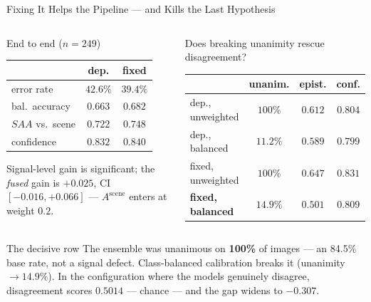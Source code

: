 \documentclass[aspectratio=169,11pt]{beamer}
\begin{document}
\begin{frame}{Fixing It Helps the Pipeline --- and Kills the Last Hypothesis}
\small
\begin{columns}[T]
\begin{exampleblock}{\small End to end ($n=249$)}
\scriptsize
\begin{tabular}{@{}l c c@{}}
\toprule
& \textbf{dep.} & \textbf{fixed} \\
\midrule
error rate & $42.6\%$ & $\mathbf{39.4\%}$ \\
bal.\ accuracy & $0.663$ & $\mathbf{0.682}$ \\
$SAA$ vs.\ scene & $0.722$ & $0.748$ \\
confidence & $0.832$ & $0.840$ \\
\bottomrule
\end{tabular}
\vspace{1mm}

{\tiny Signal-level gain is significant; the \emph{fused} gain is $+0.025$, CI $[-0.016,+0.066]$ --- $A^{\text{scene}}$ enters at weight $0.2$.}
\end{exampleblock}

\begin{center}
\scriptsize Does breaking unanimity rescue disagreement?
\vspace{1mm}

\begin{tabular}{@{}l c c c@{}}
\toprule
& \textbf{unanim.} & \textbf{epist.} & \textbf{conf.} \\
\midrule
dep., unweighted & $100\%$ & $0.612$ & $0.804$ \\
dep., balanced & $11.2\%$ & $0.589$ & $0.799$ \\
fixed, unweighted & $100\%$ & $0.647$ & $0.831$ \\
\textbf{fixed, balanced} & $\mathbf{14.9\%}$ & $\mathbf{0.501}$ & $0.809$ \\
\bottomrule
\end{tabular}
\end{center}
\end{columns}
\vspace{1mm}
\begin{alertblock}{\small The decisive row}
\footnotesize The ensemble was unanimous on \textbf{100\%} of images --- an 84.5\% base rate, not a signal defect. Class-balanced calibration breaks it (unanimity $\rightarrow 14.9\%$). In the configuration where the models genuinely disagree, disagreement scores $\mathbf{0.5014}$ --- chance --- and the gap widens to $\mathbf{-0.307}$.
\end{alertblock}
\end{frame}
\end{document}
